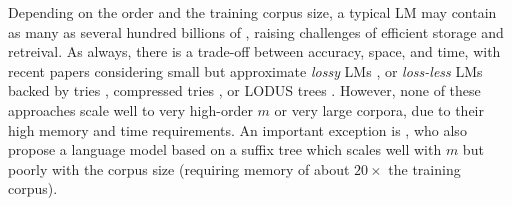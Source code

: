 Depending on the order and the training corpus size, a typical \ngram
LM may contain as many as several hundred billions of \ngrams
\cite{brants2007large},
raising challenges of efficient storage and retreival.
%
As always, there is a trade-off between accuracy, space, and time, with recent papers considering small but approximate  \emph{lossy} LMs 
\cite{Chazelle:2004:BFE:982792.982797,talbot_and_osborne_acl_2007,guthrie2010storing},
or \emph{loss-less} LMs 
backed by tries \cite{stolcke2011srilm},
compressed tries
\cite{Germann:2009:TPT:1621947.1621952,heafield2011kenlm,pauls2011faster}, 
or LODUS trees \cite{sall11,DBLP:conf/acl/WatanabeTI09}.
However, none of these approaches scale well to very high-order $m$
or very large corpora, due to their high memory and time requirements.
An important exception is
, who also propose a language model
based on a suffix tree which scales well with $m$ but poorly with the corpus size (requiring memory of
about $20\times$ the training corpus).

%
% 


